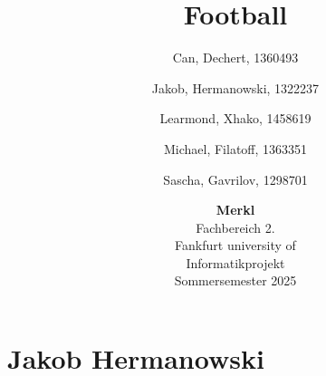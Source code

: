 \documentclass[12pt]{article}
\author{
	Can, Dechert, 1360493\\
	\and
	Jakob, Hermanowski, 1322237\\
	\and
	Learmond, Xhako, 1458619\\
	\and
	Michael, Filatoff, 1363351\\
	\and
Sascha, Gavrilov, 1298701}
\title{Football}
\date{\vspace{0.5cm}
	\textbf{Merkl}
	\vspace{0.5cm}\\
	Fachbereich 2.
	\vspace{0.5cm}\\
	Fankfurt university of
	\vspace{0.5cm} \\
	Informatikprojekt
	\vspace{0.5cm} \\
	Sommersemester 2025}
\begin{document}
\maketitle

\pagebreak
\section{Jakob Hermanowski}

\end{document}
